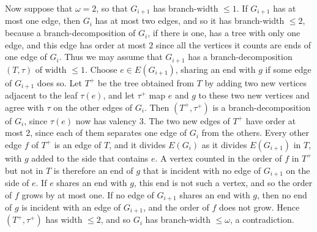 {Now suppose that $\omega = 2$, so that $G_{i+1}$ has branch-width $\le 1$. If $G_{i+1}$ has at most one edge, then $G_i$ has at most two edges, and so it has branch-width $\le 2$, because a branch-decomposition of $G_i$, if there is one, has a tree with only one edge, and this edge has order at most $2$ since all the vertices it counts are ends of one edge of $G_i$. Thus we may assume that $G_{i+1}$ has a branch-decomposition $(T, \tau)$ of width $\le 1$. Choose $e \in E(G_{i+1})$, sharing an end with $g$ if some edge of $G_{i+1}$ does so. Let $T^+$ be the tree obtained from $T$ by adding two new vertices adjacent to the leaf $\tau(e)$, and let $\tau^+$ map $e$ and $g$ to these two new vertices and agree with $\tau$ on the other edges of $G_i$. Then $(T^+, \tau^+)$ is a branch-decomposition of $G_i$, since $\tau(e)$ now has valency $3$. The two new edges of $T^+$ have order at most $2$, since each of them separates one edge of $G_i$ from the others. Every other edge $f$ of $T^+$ is an edge of $T$, and it divides $E(G_i)$ as it divides $E(G_{i+1})$ in $T$, with $g$ added to the side that contains $e$. A vertex counted in the order of $f$ in $T^+$ but not in $T$ is therefore an end of $g$ that is incident with no edge of $G_{i+1}$ on the side of $e$. If $e$ shares an end with $g$, this end is not such a vertex, and so the order of $f$ grows by at most one. If no edge of $G_{i+1}$ shares an end with $g$, then no end of $g$ is incident with an edge of $G_{i+1}$, and the order of $f$ does not grow. Hence $(T^+, \tau^+)$ has width $\le 2$, and so $G_i$ has branch-width $\le \omega$, a contradiction.}
